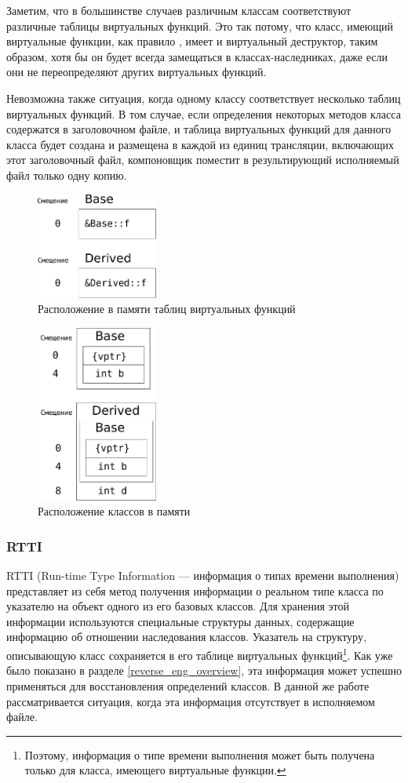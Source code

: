\documentclass[a4paper,12pt,russian]{article}
\begin{document}
Заметим, что в большинстве случаев различным классам соответствуют различные таблицы виртуальных функций.
Это так потому, что класс, имеющий виртуальные функции, как правило \cite{meyers}, имеет и виртуальный деструктор, таким образом, хотя бы он будет всегда замещаться в классах-наследниках, даже если они не переопределяют других виртуальных функций.

Невозможна также ситуация, когда одному классу соответствует несколько таблиц виртуальных функций.
В том случае, если определения некоторых методов класса содержатся в заголовочном файле, и таблица виртуальных функций для данного класса будет создана и размещена в каждой из единиц трансляции, включающих этот заголовочный файл, компоновщик поместит в результирующий исполняемый файл только одну копию.

\begin{figure}
  \center
  \includegraphics[width=4cm]{simple_vtables.pdf}
  \hfill
  \caption{Расположение в памяти таблиц виртуальных функций}
  \label{simple_vtables_fig}
\end{figure}

\begin{figure}
  \center
  \includegraphics[width=4cm]{simple_mem_layout.pdf}
  \hfill
  \caption{Расположение классов в памяти}
  \label{memlayout_fig}
\end{figure}

\subsubsection{RTTI}
RTTI (Run-time Type Information --- информация о типах времени выполнения) представляет из себя метод получения информации о реальном типе класса по указателю на объект одного из его базовых классов.
Для хранения этой информации используются специальные структуры данных, содержащие информацию об отношении наследования классов.
Указатель на структуру, описывающую класс сохраняется в его таблице виртуальных функций\footnote{Поэтому, информация о типе времени выполнения может быть получена только для класса, имеющего виртуальные функции.}.
Как уже было показано в разделе \ref{reverse_eng_overview}, эта информация может успешно применяться для восстановления определений классов.
В данной же работе рассматривается ситуация, когда эта информация отсутствует в исполняемом файле.
\end{document}
